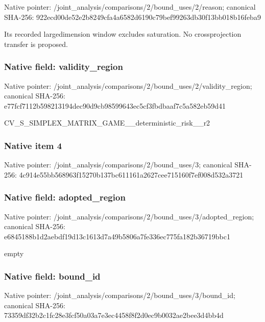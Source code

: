 \documentclass[10pt,a4paper]{article}
\begin{document}
Native pointer: /joint\_analysis/comparis\allowbreak{}ons/2/bound\_uses/2/reaso\allowbreak{}n; canonical SHA-256: 922ecd00de52e2b8249cfa4a\allowbreak{}6582d6190c79bef99263db30\allowbreak{}f13bb018b16feba9


Its recorded largedimension window excludes saturation. No crossprojection transfer is proposed.


\subsubsection{Native field: validity\_region}


Native pointer: /joint\_analysis/comparis\allowbreak{}ons/2/bound\_uses/2/valid\allowbreak{}ity\_region; canonical SHA-256: e77fcf7112b598213194dec9\allowbreak{}0d9cb98599643ec5cf3fbdba\allowbreak{}af7c5a582eb59d41


CV\_S\_SIMPLEX\_MATRIX\_GAME\allowbreak{}\_\_deterministic\_risk\_\_r2


\subsubsection{Native item 4}


Native pointer: /joint\_analysis/comparis\allowbreak{}ons/2/bound\_uses/3; canonical SHA-256: 4c914e55bb568963f15270b1\allowbreak{}37bc611161a2627cee715160\allowbreak{}f7ef008d532a3721



\subsubsection{Native field: adopted\_region}


Native pointer: /joint\_analysis/comparis\allowbreak{}ons/2/bound\_uses/3/adopt\allowbreak{}ed\_region; canonical SHA-256: e6845188b1d2aebdf19d13c1\allowbreak{}613d7a49b5806a7fe336ec77\allowbreak{}5fa182b36719bbc1


empty


\subsubsection{Native field: bound\_id}


Native pointer: /joint\_analysis/comparis\allowbreak{}ons/2/bound\_uses/3/bound\allowbreak{}\_id; canonical SHA-256: 73359df32b2c1fc28e3fcf50\allowbreak{}a03a7e3ec4458f8f2d0ec9b0\allowbreak{}032ae2bee3d4bb4d
\end{document}
